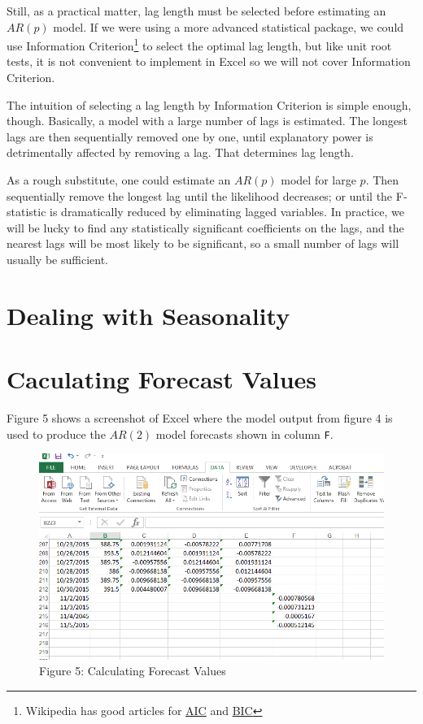 \documentclass[]{book}
\let\rmarkdownfootnote\footnote%
\def\footnote{\protect\rmarkdownfootnote}
\theoremstyle{definition}
\theoremstyle{definition}
\theoremstyle{remark}
\begin{document}
Still, as a practical matter, lag length must be selected before
estimating an \(AR(p)\) model. If we were using a more advanced
statistical package, we could use Information Criterion\footnote{Wikipedia
  has good articles for
  \href{https://en.wikipedia.org/wiki/Akaike_information_criterion}{AIC}
  and
  \href{https://en.wikipedia.org/wiki/Bayesian_information_criterion}{BIC}}
to select the optimal lag length, but like unit root tests, it is not
convenient to implement in Excel so we will not cover Information
Criterion.

The intuition of selecting a lag length by Information Criterion is
simple enough, though. Basically, a model with a large number of lags is
estimated. The longest lags are then sequentially removed one by one,
until explanatory power is detrimentally affected by removing a lag.
That determines lag length.

As a rough substitute, one could estimate an \(AR(p)\) model for large
\(p\). Then sequentially remove the longest lag until the likelihood
decreases; or until the F-statistic is dramatically reduced by
eliminating lagged variables. In practice, we will be lucky to find any
statistically significant coefficients on the lags, and the nearest lags
will be most likely to be significant, so a small number of lags will
usually be sufficient.

\section{Dealing with Seasonality}\label{dealing-with-seasonality}

\section{Caculating Forecast Values}\label{caculating-forecast-values}

Figure 5 shows a screenshot of Excel where the model output from figure
4 is used to produce the \(AR(2)\) model forecasts shown in column
\texttt{F}.

\begin{figure}[htbp]
\centering
\includegraphics{images/12_forecast_screenshot.png}
\caption{Figure 5: Calculating Forecast Values}
\end{figure}
\end{document}

